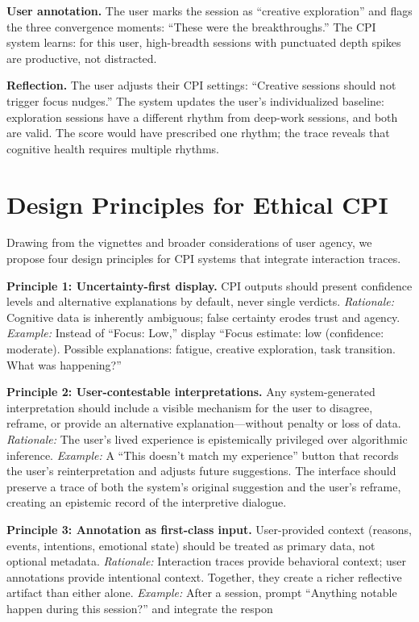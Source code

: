 \textbf{User annotation.} The user marks the session as ``creative exploration'' and flags the three convergence moments: ``These were the breakthroughs.'' The CPI system learns: for this user, high-breadth sessions with punctuated depth spikes are productive, not distracted.

\textbf{Reflection.} The user adjusts their CPI settings: ``Creative sessions should not trigger focus nudges.'' The system updates the user's individualized baseline: exploration sessions have a different rhythm from deep-work sessions, and both are valid. The score would have prescribed one rhythm; the trace reveals that cognitive health requires multiple rhythms.

\section{Design Principles for Ethical CPI}

Drawing from the vignettes and broader considerations of user agency, we propose four design principles for CPI systems that integrate interaction traces.

\textbf{Principle 1: Uncertainty-first display.} CPI outputs should present confidence levels and alternative explanations by default, never single verdicts. \textit{Rationale:} Cognitive data is inherently ambiguous; false certainty erodes trust and agency. \textit{Example:} Instead of ``Focus: Low,'' display ``Focus estimate: low (confidence: moderate). Possible explanations: fatigue, creative exploration, task transition. What was happening?''

\textbf{Principle 2: User-contestable interpretations.} Any system-generated interpretation should include a visible mechanism for the user to disagree, reframe, or provide an alternative explanation---without penalty or loss of data. \textit{Rationale:} The user's lived experience is epistemically privileged over algorithmic inference. \textit{Example:} A ``This doesn't match my experience'' button that records the user's reinterpretation and adjusts future suggestions. The interface should preserve a trace of both the system's original suggestion and the user's reframe, creating an epistemic record of the interpretive dialogue.

\textbf{Principle 3: Annotation as first-class input.} User-provided context (reasons, events, intentions, emotional state) should be treated as primary data, not optional metadata. \textit{Rationale:} Interaction traces provide behavioral context; user annotations provide intentional context. Together, they create a richer reflective artifact than either alone. \textit{Example:} After a session, prompt ``Anything notable happen during this session?'' and integrate the respon